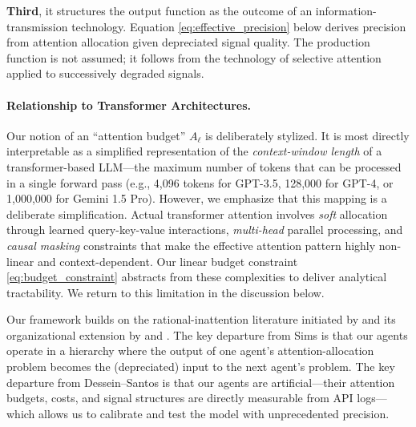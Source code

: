 \textbf{Third}, it structures the output function as the outcome of an information-transmission technology. Equation \eqref{eq:effective_precision} below derives precision from attention allocation given depreciated signal quality. The production function is not assumed; it follows from the technology of selective attention applied to successively degraded signals.

\paragraph{Relationship to Transformer Architectures.} Our notion of an ``attention budget'' $A_\ell$ is deliberately stylized. It is most directly interpretable as a simplified representation of the \emph{context-window length} of a transformer-based LLM---the maximum number of tokens that can be processed in a single forward pass (e.g., 4,096 tokens for GPT-3.5, 128,000 for GPT-4, or 1,000,000 for Gemini 1.5 Pro). However, we emphasize that this mapping is a deliberate simplification. Actual transformer attention involves \emph{soft} allocation through learned query-key-value interactions, \emph{multi-head} parallel processing, and \emph{causal masking} constraints that make the effective attention pattern highly non-linear and context-dependent. Our linear budget constraint \eqref{eq:budget_constraint} abstracts from these complexities to deliver analytical tractability. We return to this limitation in the discussion below.

Our framework builds on the rational-inattention literature initiated by \citet{sims2003implications, sims2006rational} and its organizational extension by \citet{dessein2006adaptive} and \citet{dessein2016rational}. The key departure from Sims is that our agents operate in a hierarchy where the output of one agent's attention-allocation problem becomes the (depreciated) input to the next agent's problem. The key departure from Dessein--Santos is that our agents are artificial---their attention budgets, costs, and signal structures are directly measurable from API logs---which allows us to calibrate and test the model with unprecedented precision.

